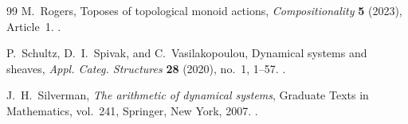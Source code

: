 \documentclass[10pt]{amsart}
\theoremstyle{plain}
\theoremstyle{definition}
\begin{document}
\begin{thebibliography}{99}
M.~Rogers,
\newblock Toposes of topological monoid actions,
\newblock \emph{Compositionality} \textbf{5} (2023), Article~1.
\newblock {}.

P.~Schultz, D.~I.~Spivak, and C.~Vasilakopoulou,
\newblock Dynamical systems and sheaves,
\newblock \emph{Appl. Categ. Structures} \textbf{28} (2020), no.~1, 1--57.
\newblock {}.

J.~H.~Silverman,
\newblock \emph{The arithmetic of dynamical systems},
\newblock Graduate Texts in Mathematics, vol.~241,
Springer, New York, 2007.
\newblock {}.

\end{thebibliography}
\end{document}
